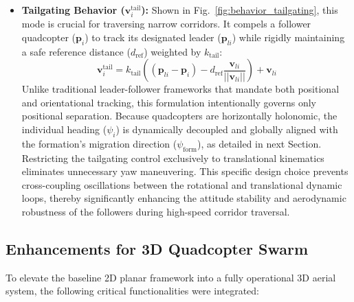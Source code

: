 \documentclass[pdflatex,sn-basic]{sn-jnl}%
\begin{document}
\begin{itemize}
            \item \textbf{Tailgating Behavior ($\boldsymbol{v}_i^{\text{tail}}$):} Shown in Fig.~\ref{fig:behavior_tailgating}, this mode is crucial for traversing narrow corridors. It compels a follower quadcopter ($\boldsymbol{p}_i$) to track its designated leader ($\boldsymbol{p}_{li}$) while rigidly maintaining a safe reference distance ($d_{\text{ref}}$) weighted by $k_{\text{tail}}$:
            \begin{equation}
                \boldsymbol{v}_{i}^{\text{tail}} = k_{\text{tail}}\left((\boldsymbol{p}_{li}-\boldsymbol{p}_{i})-d_{\text{ref}}\frac{\boldsymbol{v}_{li}}{||\boldsymbol{v}_{li}||}\right)+\boldsymbol{v}_{li}
            \end{equation}
            Unlike traditional leader-follower frameworks that mandate both positional and orientational tracking, this formulation intentionally governs only positional separation. Because quadcopters are horizontally holonomic, the individual heading ($\psi_i$) is dynamically decoupled and globally aligned with the formation's migration direction ($\psi_{\text{form}}$), as detailed in next Section. Restricting the tailgating control exclusively to translational kinematics eliminates unnecessary yaw maneuvering. This specific design choice prevents cross-coupling oscillations between the rotational and translational dynamic loops, thereby significantly enhancing the attitude stability and aerodynamic robustness of the followers during high-speed corridor traversal.
        \end{itemize}

    \subsection{Enhancements for 3D Quadcopter Swarm}
        To elevate the baseline 2D planar framework into a fully operational 3D aerial system, the following critical functionalities were integrated:
\end{document}
